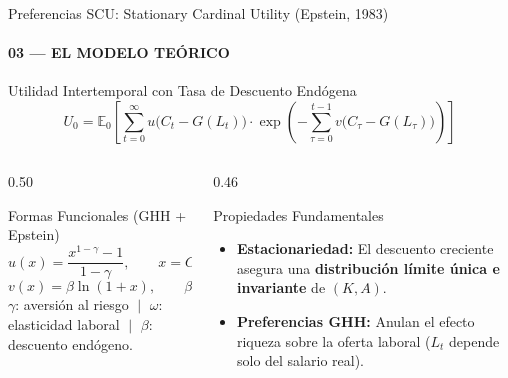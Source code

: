 \documentclass[aspectratio=169, 10pt]{beamer}
\begin{document}
\begin{frame}{Preferencias SCU: Stationary Cardinal Utility (Epstein, 1983)}
    \framesubtitle{03 --- EL MODELO TEÓRICO}

    \begin{block}{Utilidad Intertemporal con Tasa de Descuento Endógena}
        \small
        \begin{equation}
            U_0 = \mathbb{E}_0\left[\sum_{t=0}^{\infty} u\big(C_t - G(L_t)\big) \cdot \exp\left(-\sum_{\tau=0}^{t-1} v\big(C_\tau - G(L_\tau)\big)\right)\right]
        \end{equation}
    \end{block}

    \begin{columns}[T]
        \begin{column}{0.50\textwidth}
            \begin{exampleblock}{Formas Funcionales (GHH + Epstein)}
                \small
                \begin{equation}
                    u(x) = \frac{x^{1-\gamma}-1}{1-\gamma}, \qquad x = C_t - \frac{L_t^{\omega}}{\omega}
                \end{equation}
                \begin{equation}
                    v(x) = \beta \ln(1+x), \qquad \beta > 0
                \end{equation}
                \scriptsize $\gamma$: aversión al riesgo $\;\vert\;$ $\omega$: elasticidad laboral $\;\vert\;$ $\beta$: descuento endógeno.
            \end{exampleblock}
        \end{column}
        \begin{column}{0.46\textwidth}
            \begin{block}{Propiedades Fundamentales}
                \small
                \begin{itemize}
                    \item \textbf{Estacionariedad:} El descuento creciente asegura una \textbf{distribución límite única e invariante} de $(K, A)$.
                    \item \textbf{Preferencias GHH:} Anulan el efecto riqueza sobre la oferta laboral ($L_t$ depende solo del salario real).
                \end{itemize}
            \end{block}
        \end{column}
    \end{columns}
\end{frame}
\end{document}
